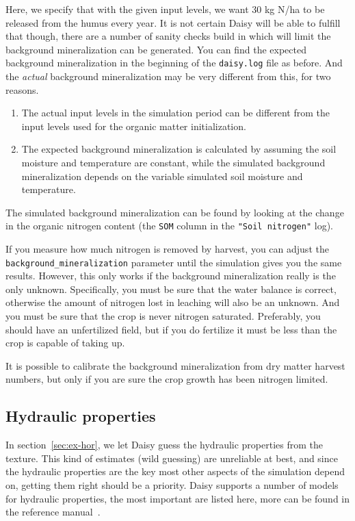 \documentclass[a4paper]{article}
\begin{document}
Here, we specify that with the given input levels, we want 30 kg N/ha
to be released from the humus every year.  It is not certain Daisy
will be able to fulfill that though, there are a number of sanity
checks build in which will limit the background mineralization can be
generated.  You can find the expected background mineralization in the
beginning of the \texttt{daisy.log} file as before.  And the
\emph{actual} background mineralization may be very different from
this, for two reasons.
\begin{enumerate}
\item The actual input levels in the simulation period can be
  different from the input levels used for the organic matter
  initialization.
\item The expected background mineralization is calculated by assuming
  the soil moisture and temperature are constant, while the simulated
  background mineralization depends on the variable simulated soil
  moisture and temperature.
\end{enumerate}
The simulated background mineralization can be found by looking at the
change in the organic nitrogen content (the \texttt{SOM} column in the
\texttt{"Soil nitrogen"} log).

If you measure how much nitrogen is removed by harvest, you can adjust
the \texttt{background\_mineralization} parameter until the simulation
gives you the same results.  However, this only works if the
background mineralization really is the only unknown.  Specifically,
you must be sure that the water balance is correct, otherwise the
amount of nitrogen lost in leaching will also be an unknown.  And you
must be sure that the crop is never nitrogen saturated.  Preferably,
you should have an unfertilized field, but if you do fertilize it must
be less than the crop is capable of taking up.

It is possible to calibrate the background mineralization from dry
matter harvest numbers, but only if you are sure the crop growth has
been nitrogen limited.

\subsection{Hydraulic properties}
\label{sec:hydraulic}

In section~\ref{sec:ex-hor}, we let Daisy guess the hydraulic
properties from the texture.  This kind of estimates (wild guessing)
are unreliable at best, and since the hydraulic properties are the key
most other aspects of the simulation depend on, getting them right
should be a priority.  Daisy supports a number of models for
hydraulic properties, the most important are listed here, more can be
found in the reference manual~\cite{dina81}.
\end{document}
